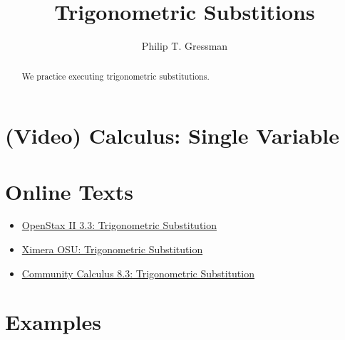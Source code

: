 \documentclass{ximera}
\title{Trigonometric Substitions}
\author{Philip T. Gressman}
\begin{document}
\begin{abstract}
  We practice executing trigonometric substitutions.
\end{abstract}
\maketitle

\section*{(Video) Calculus: Single Variable}

\section*{Online Texts}
\begin{itemize}
\item \href{https://openstax.org/books/calculus-volume-2/pages/3-3-trigonometric-substitution}{OpenStax II 3.3: Trigonometric Substitution}
\item \href{https://ximera.osu.edu/mooculus/calculus2/trigonometricSubstitution/titlePage}{Ximera OSU: Trigonometric Substitution}
\item \href{https://www.whitman.edu/mathematics/calculus_online/section08.03.html}{Community Calculus 8.3: Trigonometric Substitution}
\end{itemize}


\section*{Examples}

\begin{example}

\end{example}

\begin{example}

\end{example}
\end{document}
